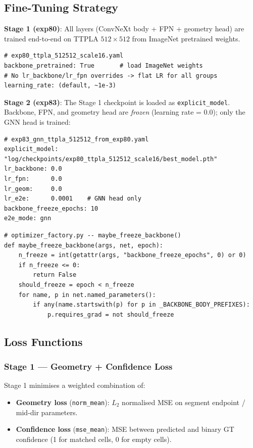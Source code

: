 \documentclass[11pt,a4paper]{article}
\begin{document}
\subsection{Fine-Tuning Strategy}
\label{subsec:finetuning}

\textbf{Stage 1 (exp80)}: All layers (ConvNeXt body + FPN + geometry head) are
trained end-to-end on TTPLA $512\times512$ from ImageNet pretrained weights.

\begin{lstlisting}
# exp80_ttpla_512512_scale16.yaml
backbone_pretrained: True       # load ImageNet weights
# No lr_backbone/lr_fpn overrides -> flat LR for all groups
learning_rate: (default, ~1e-3)
\end{lstlisting}

\textbf{Stage 2 (exp83)}: The Stage 1 checkpoint is loaded as \texttt{explicit\_model}.
Backbone, FPN, and geometry head are \emph{frozen} (learning rate = 0.0);
only the GNN head is trained:

\begin{lstlisting}
# exp83_gnn_ttpla_512512_from_exp80.yaml
explicit_model: "log/checkpoints/exp80_ttpla_512512_scale16/best_model.pth"
lr_backbone: 0.0
lr_fpn:      0.0
lr_geom:     0.0
lr_e2e:      0.0001    # GNN head only
backbone_freeze_epochs: 10
e2e_mode: gnn
\end{lstlisting}

\begin{lstlisting}
# optimizer_factory.py -- maybe_freeze_backbone()
def maybe_freeze_backbone(args, net, epoch):
    n_freeze = int(getattr(args, "backbone_freeze_epochs", 0) or 0)
    if n_freeze <= 0:
        return False
    should_freeze = epoch < n_freeze
    for name, p in net.named_parameters():
        if any(name.startswith(p) for p in _BACKBONE_BODY_PREFIXES):
            p.requires_grad = not should_freeze
\end{lstlisting}

\subsection{Loss Functions}
\label{subsec:loss}

\subsubsection{Stage 1 --- Geometry + Confidence Loss}

Stage 1 minimises a weighted combination of:
\begin{itemize}
  \item \textbf{Geometry loss} (\texttt{norm\_mean}): $L_2$ normalised MSE on
        segment endpoint / mid-dir parameters.
  \item \textbf{Confidence loss} (\texttt{mse\_mean}): MSE between predicted and
        binary GT confidence (1 for matched cells, 0 for empty cells).
\end{itemize}
\end{document}
